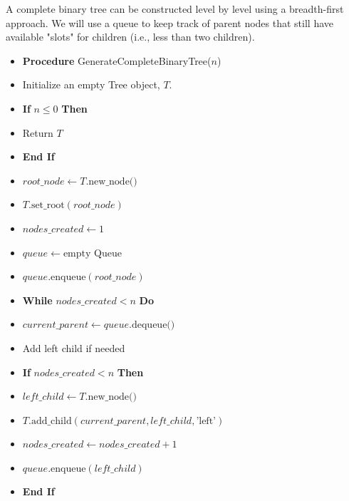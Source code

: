 \documentclass{article}
\begin{document}
A complete binary tree can be constructed level by level using a breadth-first approach. We will use a queue to keep track of parent nodes that still have available "slots" for children (i.e., less than two children).

\begin{itemize}
    \item \textbf{Procedure} GenerateCompleteBinaryTree($n$)
    \item \hspace{0.5cm} Initialize an empty Tree object, $T$.
    \item \hspace{0.5cm} \textbf{If} $n \le 0$ \textbf{Then}
    \item \hspace{1cm} Return $T$
    \item \hspace{0.5cm} \textbf{End If}
    
    \item \hspace{0.5cm} $root\_node \gets T.\text{new\_node()}$
    \item \hspace{0.5cm} $T.\text{set\_root}(root\_node)$
    \item \hspace{0.5cm} $nodes\_created \gets 1$
    \item \hspace{0.5cm} $queue \gets \text{empty Queue}$
    \item \hspace{0.5cm} $queue.\text{enqueue}(root\_node)$
    
    \item \hspace{0.5cm} \textbf{While} $nodes\_created < n$ \textbf{Do}
    \item \hspace{1cm} $current\_parent \gets queue.\text{dequeue()}$
        
    \item \hspace{1cm} Add left child if needed
    \item \hspace{1cm} \textbf{If} $nodes\_created < n$ \textbf{Then}
    \item \hspace{1.5cm} $left\_child \gets T.\text{new\_node()}$
    \item \hspace{1.5cm} $T.\text{add\_child}(current\_parent, left\_child, \text{'left'})$
    \item \hspace{1.5cm} $nodes\_created \gets nodes\_created + 1$
    \item \hspace{1.5cm} $queue.\text{enqueue}(left\_child)$
    \item \hspace{1cm} \textbf{End If}
        

\end{itemize}
\end{document}
